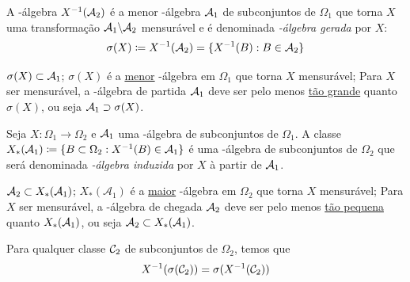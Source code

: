 \begin{definition}
	A \sig-álgebra $X^{-1}(\mathcal{A}_2)$ é a menor \sig-álgebra $\mathcal{A}_1$ de subconjuntos de $\Omega_1$ que torna $X$ uma transformação $\mathcal{A}_1\backslash\mathcal{A}_2$ mensurável e é denominada \textit{\sig-álgebra gerada} por $X$:
	\begin{equation}
		\sigma(X) \coloneq X^{-1}(\mathcal{A}_2) = \{X^{-1}(B): B \in \mathcal{A}_2\}
	\end{equation}
\end{definition}

\begin{note}
	\leavevmode
	\begin{outline}[enumerate]
		\1 $\sigma(X) \subset \mathcal{A}_1$;
		\1 $\sigma(X)$ é a \underline{menor} \sig-álgebra em $\Omega_1$ que torna $X$ mensurável;
		\1 Para $X$ ser mensurável, a \sig-álgebra de partida $\mathcal{A}_1$ deve ser pelo menos \underline{tão grande} quanto $\sigma(X)$, ou seja $\mathcal{A}_1 \supset \sigma(X)$.
	\end{outline}
\end{note}

\begin{theorem}
	Seja $X\colon\Omega_1\to\Omega_2$ e $\mathcal{A}_1$ uma \sig-álgebra de subconjuntos de $\Omega_1$. A classe $X_*(\mathcal{A}_1) \coloneq \{ B \subset \Omega_2: X^{-1}(B) \in \mathcal{A}_1 \}$ é uma \sig-álgebra de subconjuntos de $\Omega_2$ que será denominada \textit{\sig-álgebra induzida} por $X$ à partir de $\mathcal{A}_1$.
\end{theorem}

\begin{note}
	\leavevmode
	\begin{outline}[enumerate]
		\1 $\mathcal{A}_2 \subset X_*(\mathcal{A}_1)$;
		\1 $X_*(\mathcal{A}_1)$ é a \underline{maior} \sig-álgebra em $\Omega_2$ que torna $X$ mensurável;
		\1 Para $X$ ser mensurável, a \sig-álgebra de chegada $\mathcal{A}_2$ deve ser pelo menos \underline{tão pequena} quanto $X_*(\mathcal{A}_1)$, ou seja $\mathcal{A}_2 \subset X_*(\mathcal{A}_1)$.
	\end{outline}
\end{note}

\begin{theorem}[2.2] 
	Para qualquer classe $\mathcal{C}_2$ de subconjuntos de $\Omega_2$, temos que
	\begin{equation}
		X^{-1}(\sigma(\mathcal{C}_2)) = \sigma(X^{-1}(\mathcal{C}_2))
	\end{equation}
\end{theorem}

